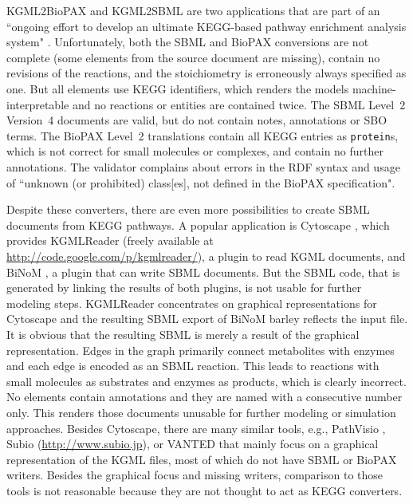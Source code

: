 \documentclass[10pt]{bmc_article}
\newenvironment{bmcformat}{\baselineskip20pt\sloppy\setboolean{publ}{false}}{\baselineskip20pt\sloppy}
\newcommand{\proteins}{\texttt{protein}s}
\begin{document}
\begin{bmcformat}
KGML2BioPAX and KGML2SBML are two applications that are part of an ``ongoing effort to develop an ultimate KEGG-based pathway enrichment analysis system" \cite{KEGG2BioPAX_and_SBML}. Unfortunately, both the SBML and BioPAX conversions are not complete (some elements from the source document are missing), contain no revisions of the reactions, and the stoichiometry is erroneously always specified as one. But all elements use KEGG identifiers, which renders the models machine-interpretable and no reactions or entities are contained twice. The SBML Level~2 Version~4 documents are valid, but do not contain notes, annotations or SBO terms. The BioPAX Level~2 translations contain all KEGG entries as \proteins, which is not correct for small molecules or complexes, and contain no further annotations. The validator complains about errors in the RDF syntax and usage of ``unknown (or prohibited) class[es], not defined in the BioPAX specification".

Despite these converters, there are even more possibilities to create SBML documents from KEGG pathways. A popular application is Cytoscape \cite{Cytoscape}, which provides KGMLReader (freely available at \url{http://code.google.com/p/kgmlreader/}), a plugin to read KGML documents, and BiNoM \cite{Zinovyev2008}, a plugin that can write SBML documents.
But the SBML code, that is generated by linking the results of both plugins, is not usable for further modeling steps. KGMLReader concentrates on graphical representations for Cytoscape and the resulting SBML export of BiNoM barley reflects the input file. It is obvious that the resulting SBML is merely a result of the graphical representation. Edges in the graph primarily connect metabolites with enzymes and each edge is encoded as an SBML reaction. This leads to reactions with small molecules as substrates and enzymes as products, which is clearly incorrect. No elements contain annotations and they are named with a consecutive number only. This renders those documents unusable for further modeling or simulation approaches.
Besides Cytoscape, there are many similar tools, e.g., PathVisio \cite{PathVisio}, Subio (\url{http://www.subio.jp}), or VANTED \cite{VANTED} that mainly focus on a graphical representation of the KGML files, most of which do not have SBML or BioPAX writers. Besides the graphical focus and missing writers, comparison to those tools is not reasonable because they are not thought to act as KEGG converters.


\end{bmcformat}
\end{document}
